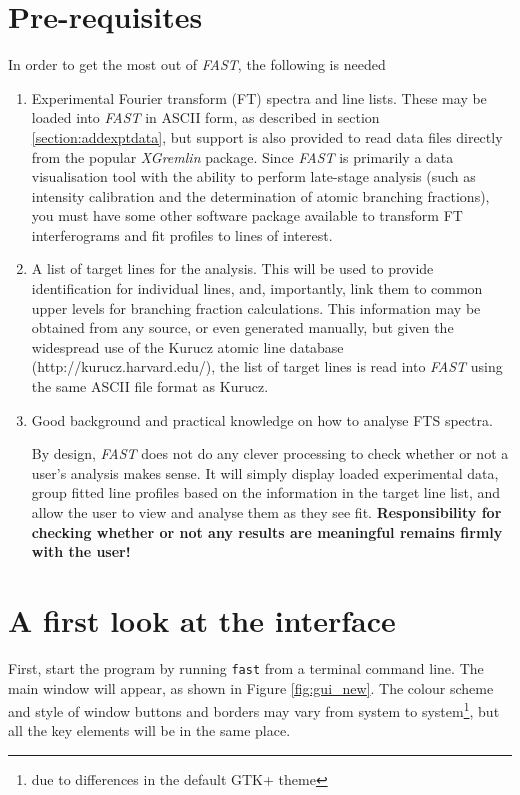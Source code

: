 \documentclass[a4paper,12pt]{report}
\newcommand{\fast}{\emph{FAST} }
\newcommand{\xgremlin}{\emph{XGremlin} }
\begin{document}
\section{Pre-requisites}
In order to get the most out of \emph{FAST}, the following is needed
\begin{enumerate}
\item Experimental Fourier transform (FT) spectra and line lists. These may be loaded into \fast in ASCII form, as described in section \ref{section:addexptdata}, but support is also provided to read data files directly from the popular \xgremlin package.
Since \fast is primarily a data visualisation tool with the ability to perform late-stage analysis (such as intensity calibration and the determination of atomic branching fractions), you must have some other software package available to transform FT interferograms and fit profiles to lines of interest.
\item A list of target lines for the analysis. This will be used to provide identification for individual lines, and, importantly, link them to common upper levels for branching fraction calculations. This information may be obtained from any source, or even generated manually, but given the widespread use of the Kurucz atomic line database (http://kurucz.harvard.edu/), the list of target lines is read into \fast using the same ASCII file format as Kurucz.
\item Good background and practical knowledge on how to analyse FTS spectra.

By design, \fast does not do any clever processing to check whether or not a user's analysis makes sense. It will simply display loaded experimental data, group fitted line profiles based on the information in the target line list, and allow the user to view and analyse them as they see fit. {\bf Responsibility for checking whether or not any results are meaningful remains firmly with the user!}
\end{enumerate}
\section{A first look at the interface}
First, start the program by running \verb|fast| from a terminal command line. The main window will appear, as shown in Figure \ref{fig:gui_new}. The colour scheme and style of window buttons and borders may vary from system to system\footnote{due to differences in the default GTK+ theme}, but all the key elements will be in the same place.
\end{document}
